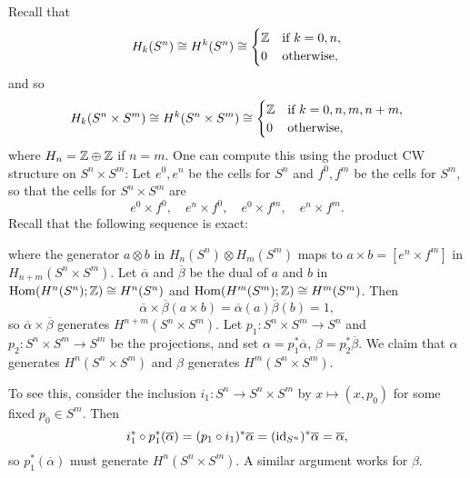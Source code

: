 \begin{example}
  Recall that
  \[
    H_k(S^n) \cong H^k(S^n) \cong
    \begin{cases}
      \mathbb{Z} & \text{if } k = 0, n, \\
      0 & \text{otherwise},
    \end{cases}
  \]
  and so
  \[
    H_k(S^n \times S^m) \cong
    H^k(S^n \times S^m) \cong
    \begin{cases}
      \mathbb{Z} & \text{if } k = 0, n, m, n + m, \\
      0 & \text{otherwise},
    \end{cases}
  \]
  where $H_n = \mathbb{Z} \oplus \mathbb{Z}$ if $n = m$.
  One can compute this using the product
  CW structure on $S^n \times S^m$: Let
  $e^0, e^n$ be the cells for $S^n$ and
  $f^0, f^m$ be the cells for $S^m$, so
  that the cells for $S^n \times S^m$ are
  \[
    e^0 \times f^0, \quad e^n \times f^0,
    \quad e^0 \times f^m, \quad e^n \times f^m.
  \]
  Recall that the following sequence is exact:
  \begin{center}
  \end{center}
  where the generator $a \otimes b$ in $H_n(S^n) \otimes H_m(S^m)$ maps to
  $a \times b = [e^n \times f^m]$ in $H_{n + m}(S^n \times S^m)$.
  Let $\overline{\alpha}$ and $\overline{\beta}$ be the dual of $a$ and $b$ in
  $\operatorname{Hom}(H^n(S^n); \mathbb{Z}) \cong H^n(S^n)$ and
  $\operatorname{Hom}(H^m(S^m); \mathbb{Z}) \cong H^m(S^m)$. Then
  \[
    \overline{\alpha} \times \overline{\beta}(a \times b) = \overline{\alpha}(a) \overline{\beta}(b) = 1,
  \]
  so $\overline{\alpha} \times \overline{\beta}$
  generates $H^{n + m}(S^n \times S^m)$.
  Let $p_1 : S^n \times S^m \to S^n$
  and $p_2 : S^n \times S^m \to S^m$ be
  the projections, and set
  $\alpha = p_1^* \overline{\alpha}$,
  $\beta = p_2^* \overline{\beta}$.
  We claim that $\alpha$ generates
  $H^n(S^n \times S^m)$ and $\beta$ generates
  $H^m(S^n \times S^m)$.

  To see this, consider the inclusion $i_1 : S^n \to S^n \times S^m$
  by $x \mapsto (x, p_0)$ for some fixed
  $p_0 \in S^m$. Then
  \[
    i_1^* \circ p_1^* (\overline{\alpha})
    = (p_1 \circ i_1)^* \overline{\alpha}
    = (\operatorname{id}_{S^n})^* \overline{\alpha}
    = \overline{\alpha},
  \]
  so $p_1^*(\overline{\alpha})$ must
  generate $H^n(S^n \times S^m)$. A similar
  argument works for $\beta$.


\end{example}
